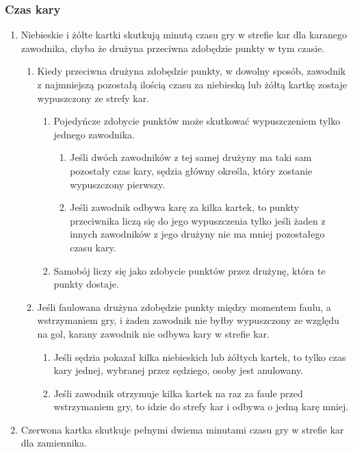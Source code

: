 \documentclass[11pt,a4paper]{article}
\begin{document}
\subsubsection{Czas kary}
\begin{enumerate}
  \item Niebieskie i żółte kartki skutkują minutą czasu gry w strefie kar dla karanego zawodnika, chyba że drużyna przeciwna zdobędzie punkty w tym czasie.
  \begin{enumerate}
    \item Kiedy przeciwna drużyna zdobędzie punkty, w dowolny sposób, zawodnik z najmniejszą pozostałą ilością czasu za niebieską lub żółtą kartkę zostaje wypuszczony ze strefy kar.
    \begin{enumerate}
      \item Pojedyńcze zdobycie punktów może skutkować wypuszczeniem tylko jednego zawodnika.
      \begin{enumerate}
        \item Jeśli dwóch zawodników z tej samej drużyny ma taki sam pozostały czas kary, sędzia główny określa, który zostanie wypuszczony pierwszy.
        \item Jeśli zawodnik odbywa karę za kilka kartek, to punkty przeciwnika liczą się do jego wypuszczenia tylko jeśli żaden z innych zawodników z jego drużyny nie ma mniej pozostałego czasu kary.
      \end{enumerate}
      \item Samobój liczy się jako zdobycie punktów przez drużynę, która te punkty dostaje.
    \end{enumerate}
    \item Jeśli faulowana drużyna zdobędzie punkty między momentem faulu, a wstrzymaniem gry, i żaden zawodnik nie byłby wypuszczony ze względu na gol, karany zawodnik nie odbywa kary w strefie kar.
    \begin{enumerate}
      \item Jeśli sędzia pokazał kilka niebieskich lub żółtych kartek, to tylko czas kary jednej, wybranej przez sędziego, osoby jest anulowany.
      \item Jeśli zawodnik otrzymuje kilka kartek na raz za faule przed wstrzymaniem gry, to idzie do strefy kar i odbywa o jedną karę mniej.
    \end{enumerate}
  \end{enumerate}
  \item Czerwona kartka skutkuje pełnymi dwiema minutami czasu gry w strefie kar dla zamiennika.
  \begin{enumerate}

\end{enumerate}
\end{enumerate}
\end{document}

